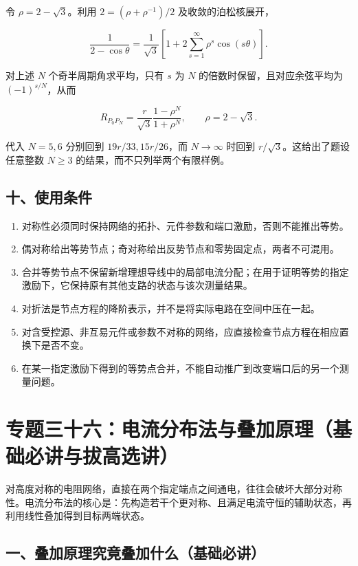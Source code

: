 令 \(\rho=2-\sqrt3\)。利用 \(2=(\rho+\rho^{-1})/2\) 及收敛的泊松核展开，

\[
\frac1{2-\cos\theta}
=\frac1{\sqrt3}\left[1+2\sum_{s=1}^{\infty}\rho^s\cos(s\theta)\right].
\]

对上述 \(N\) 个奇半周期角求平均，只有 \(s\) 为 \(N\)
的倍数时保留，且对应余弦平均为 \((-1)^{s/N}\)，从而

\[
\boxed{
R_{P_0P_N}=\frac r{\sqrt3}
\frac{1-\rho^N}{1+\rho^N},\qquad \rho=2-\sqrt3
}.
\]

代入 \(N=5,6\) 分别回到 \(19r/33,15r/26\)，而 \(N\to\infty\) 时回到
\(r/\sqrt3\)。这给出了题设任意整数 \(N\ge3\)
的结果，而不只列举两个有限样例。

\subsection{十、使用条件}\label{m4:ux5341ux4f7fux7528ux6761ux4ef6}

\begin{enumerate}
\def\labelenumi{\arabic{enumi}.}
\tightlist
\item
  对称性必须同时保持网络的拓扑、元件参数和端口激励，否则不能推出等势。
\item
  偶对称给出等势节点；奇对称给出反势节点和零势固定点，两者不可混用。
\item
  合并等势节点不保留新增理想导线中的局部电流分配；在用于证明等势的指定激励下，它保持原有其他支路的状态与该次测量结果。
\item
  对折法是节点方程的降阶表示，并不是将实际电路在空间中压在一起。
\item
  对含受控源、非互易元件或参数不对称的网络，应直接检查节点方程在相应置换下是否不变。
\item
  在某一指定激励下得到的等势点合并，不能自动推广到改变端口后的另一个测量问题。
\end{enumerate}

\section{专题三十六：电流分布法与叠加原理（基础必讲与拔高选讲）}\label{m4:ux4e13ux9898ux4e09ux5341ux516dux7535ux6d41ux5206ux5e03ux6cd5ux4e0eux53e0ux52a0ux539fux7406ux57faux7840ux5fc5ux8bb2ux4e0eux62d4ux9ad8ux9009ux8bb2}

对高度对称的电阻网络，直接在两个指定端点之间通电，往往会破坏大部分对称性。电流分布法的核心是：先构造若干个更对称、且满足电流守恒的辅助状态，再利用线性叠加得到目标两端状态。

\subsection{一、叠加原理究竟叠加什么（基础必讲）}\label{m4:ux4e00ux53e0ux52a0ux539fux7406ux7a76ux7adfux53e0ux52a0ux4ec0ux4e48ux57faux7840ux5fc5ux8bb2}

